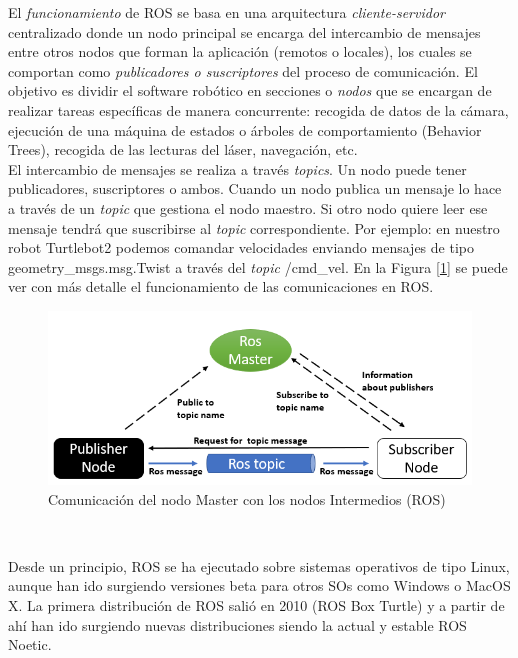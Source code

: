 El \textit{funcionamiento} de ROS se basa en una arquitectura \textit{cliente-servidor} centralizado donde un nodo principal se encarga del intercambio de mensajes entre otros nodos que forman la aplicación (remotos o locales), los cuales se comportan como \textit{publicadores o suscriptores} del proceso de comunicación. El objetivo es dividir el software robótico en secciones o \textit{nodos} que se encargan de realizar tareas específicas de manera concurrente: recogida de datos de la cámara, ejecución de una máquina de estados o árboles de comportamiento (Behavior Trees), recogida de las lecturas del láser, navegación, etc.\\

El intercambio de mensajes se realiza a través \textit{topics}. Un nodo puede tener publicadores, suscriptores o ambos. Cuando un nodo publica un mensaje lo hace a través de un \textit{topic} que gestiona el nodo maestro. Si otro nodo quiere leer ese mensaje tendrá que suscribirse al \textit{topic} correspondiente. Por ejemplo: en nuestro robot Turtlebot2 podemos comandar velocidades enviando mensajes de tipo geometry\_msgs.msg.Twist a través del \textit{topic} /cmd\_vel. En la Figura [\ref{fig:ros_master_comunicacion}] se puede ver con más detalle el funcionamiento de las comunicaciones en ROS.\\

\begin{figure} [H]
  \begin{center}
    \includegraphics[width=15cm]{imagenes/cap3/ros_master_communication.png}
  \end{center}
  \caption{Comunicación del nodo Master con los nodos Intermedios (ROS)}
  \label{fig:ros_master_comunicacion}
\end{figure}\

Desde un principio, ROS se ha ejecutado sobre sistemas operativos de tipo Linux, aunque han ido surgiendo versiones beta para otros SOs como Windows o MacOS X. La primera distribución de ROS salió en 2010 (ROS Box Turtle) y a partir de ahí han ido surgiendo nuevas distribuciones siendo la actual y estable ROS Noetic.\\

